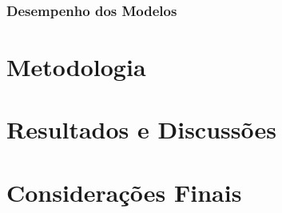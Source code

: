 \documentclass[
	12pt,				%
	openright,			%
	oneside,      %
	a4paper,			%
	english,			%
	french,				%
	spanish,			%
	brazil,				%
	]{abntex2}\usepackage[]{graphicx}\usepackage[]{xcolor}
\begin{document}
      \subsection{Desempenho dos Modelos}


\chapter{Metodologia}






\chapter{Resultados e Discussões}





\chapter{Considerações Finais}






%
%


\end{document}

